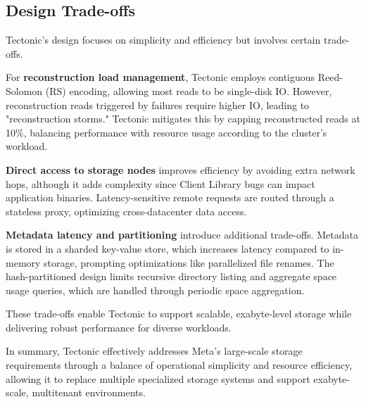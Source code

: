 \subsection{Design Trade-offs}

Tectonic’s design focuses on simplicity and efficiency but involves certain trade-offs.

For \textbf{reconstruction load management}, Tectonic employs contiguous Reed-Solomon (RS) encoding, allowing most reads to be single-disk IO. However, reconstruction reads triggered by failures require higher IO, leading to "reconstruction storms." Tectonic mitigates this by capping reconstructed reads at 10\%, balancing performance with resource usage according to the cluster's workload.

\textbf{Direct access to storage nodes} improves efficiency by avoiding extra network hops, although it adds complexity since Client Library bugs can impact application binaries. Latency-sensitive remote requests are routed through a stateless proxy, optimizing cross-datacenter data access.

\textbf{Metadata latency and partitioning} introduce additional trade-offs. Metadata is stored in a sharded key-value store, which increases latency compared to in-memory storage, prompting optimizations like parallelized file renames. The hash-partitioned design limits recursive directory listing and aggregate space usage queries, which are handled through periodic space aggregation.

These trade-offs enable Tectonic to support scalable, exabyte-level storage while delivering robust performance for diverse workloads.

\medskip

In summary, Tectonic effectively addresses Meta’s large-scale storage requirements through a balance of operational simplicity and resource efficiency, allowing it to replace multiple specialized storage systems and support exabyte-scale, multitenant environments.
